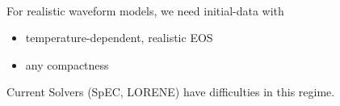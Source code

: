 {\begin{columns}
\begin{column}{.48\textwidth}
\vspace{-.2cm}
\\
\vspace{.5cm}
\begin{tcolorbox}
\scriptsize For realistic waveform models, we need initial-data with 
\begin{itemize}
\item[\blacksquare]temperature-dependent, realistic EOS
\item[\blacksquare]any compactness
\end{itemize}

Current Solvers (SpEC, LORENE) have difficulties in this regime.
\end{tcolorbox}    
  \end{column}
\end{columns}



}



